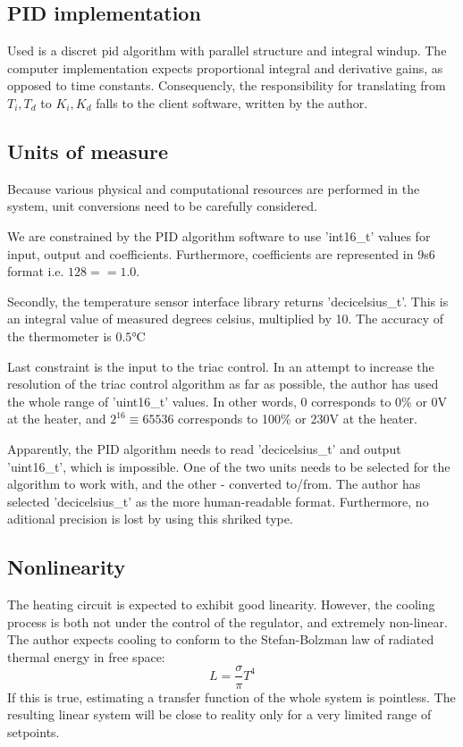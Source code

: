 \subsection{PID implementation}
Used is a discret pid algorithm with parallel structure and integral windup.
The computer implementation expects proportional integral and derivative gains, as opposed to time constants.
Consequencly, the responsibility for translating from $T_i, T_d$ to $K_i, K_d$ falls to the client software, written by the author.

\subsection{Units of measure}
Because various physical and computational resources are performed in the system, unit conversions need to be carefully considered.
\par
We are constrained by the PID algorithm software to use 'int16\_t' values for input, output and coefficients.
Furthermore, coefficients are represented in 9s6 format i.e. $128 == 1.0$.
\par
Secondly, the temperature sensor interface library returns 'decicelsius\_t'.
This is an integral value of measured degrees celsius, multiplied by 10.
The accuracy of the thermometer is $0.5\si{\celsius}$
\par
Last constraint is the input to the triac control.
In an attempt to increase the resolution of the triac control algorithm as far as possible, the author has used the whole range of 'uint16\_t' values.
In other words, 0 corresponds to 0\% or 0\si{\volt} at the heater, and $2^16 \equiv 65536$ corresponds to 100\% or 230\si{\volt} at the heater.
\par
Apparently, the PID algorithm needs to read 'decicelsius\_t' and output 'uint16\_t', which is impossible.
One of the two units needs to be selected for the algorithm to work with, and the other - converted to/from.
The author has selected 'decicelsius\_t' as the more human-readable format.
Furthermore, no aditional precision is lost by using this shriked type.

\subsection{Nonlinearity}
The heating circuit is expected to exhibit good linearity.
However, the cooling process is both not under the control of the regulator, and extremely non-linear.
The author expects cooling to conform to the Stefan-Bolzman law of radiated thermal energy in free space:
$$ L = \frac{\sigma}{\pi}T^4 $$
If this is true, estimating a transfer function of the whole system is pointless.
The resulting linear system will be close to reality only for a very limited range of setpoints.

